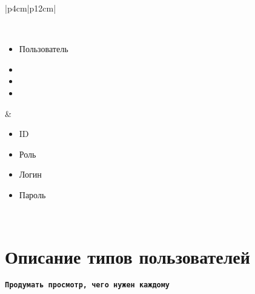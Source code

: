 \begin{table}[h!]
\begin{center}
\begin{threeparttable}
\begin{tabular}{|p{4cm}|p{12cm}|}
\begin{minipage}[t]{\linewidth}
\begin{multicols}{2}
              \end{multicols}
            \end{minipage}\\
            \hline
            \begin{minipage}[t]{\linewidth}
              \begin{multicols}{0}
                \begin{itemize}[labelsep=0mm,nosep,after=\strut]
                  \item[] Пользователь
                  \item[]
                  \item[]
                  \item[]
                \end{itemize}
              \end{multicols}
            \end{minipage}
          & \begin{minipage}[t]{\linewidth}
              \begin{multicols}{2}
                \begin{itemize}[labelsep=0mm,nosep,after=\strut]
                  \item[] ID
                  \item[] Роль
                  \item[] Логин
                  \item[] Пароль
                \end{itemize}
              \end{multicols}
            \end{minipage}\\
           \hline
        \end{tabular}
    \end{threeparttable}
    \end{center}
\end{table} 

\section{Описание типов пользователей}

\textbf{\texttt{Продумать просмотр, чего нужен каждому}}

